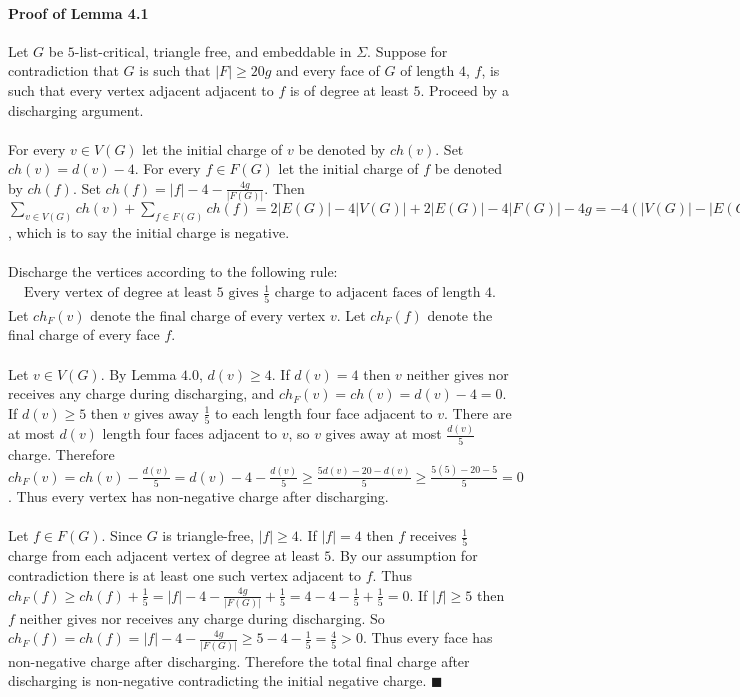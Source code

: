 \documentclass[letterpaper,12pt,oneside,onecolumn]{report}
\begin{document}
\paragraph{Proof of Lemma 4.1}
Let $G$ be $5$-list-critical, triangle free, and embeddable in $\Sigma$. Suppose for contradiction that $G$ is such that $|F| \geq 20g$ and every face of $G$ of length $4$, $f$, is such that every vertex adjacent adjacent to $f$ is of degree at least $5$. Proceed by a discharging argument.
\paragraph{}
For every $v \in V(G)$ let the initial charge of $v$ be denoted by $ch(v)$. Set $ch(v) = d(v) - 4$. For every $f \in F(G)$ let the initial charge of $f$ be denoted by $ch(f)$. Set $ch(f) = |f| - 4 -\frac{4g}{|F(G)|}$. Then $\sum_{v \in V(G)} ch(v) + \sum_{f \in F(G)} ch(f) = 2|E(G)| - 4|V(G)| + 2|E(G)| - 4|F(G)| -4g = -4(|V(G)| - |E(G)| + |F(G)| + g) = -4(2-g + g) = -8$, which is to say the initial charge is negative.
\paragraph{}
Discharge the vertices according to the following rule:
\begin{align}
\text{Every vertex of degree at least $5$ gives $\frac{1}{5}$ charge to adjacent faces of length $4$.}
\end{align}
Let $ch_F(v)$ denote the final charge of every vertex $v$. Let $ch_F(f)$ denote the final charge of every face $f$.
\paragraph{}
Let $v \in V(G)$. By Lemma $4.0$, $d(v) \geq 4$. If $d(v) = 4$ then $v$ neither gives nor receives any charge during discharging, and $ch_F(v) = ch(v) = d(v) - 4 = 0$. If $d(v) \geq 5$ then $v$ gives away $\frac{1}{5}$ to each length four face adjacent to $v$. There are at most $d(v)$ length four faces adjacent to $v$, so $v$ gives away at most $\frac{d(v)}{5}$ charge. Therefore $ch_F(v) = ch(v) - \frac{d(v)}{5} = d(v) - 4 - \frac{d(v)}{5} \geq \frac{5d(v) - 20 - d(v)}{5} \geq \frac{5(5) - 20 -5}{5} = 0$. Thus every vertex has non-negative charge after discharging.
\paragraph{}
Let $f \in F(G)$. Since $G$ is triangle-free, $|f| \geq 4$. If $|f| = 4$ then $f$ receives $\frac{1}{5}$ charge from each adjacent vertex of degree at least $5$. By our assumption for contradiction there is at least one such vertex adjacent to $f$. Thus $ch_F(f) \geq ch(f) + \frac{1}{5} = |f| - 4 - \frac{4g}{|F(G)|} + \frac{1}{5} = 4 - 4 - \frac{1}{5} + \frac{1}{5} = 0$. If $|f| \geq 5$ then $f$ neither gives nor receives any charge during discharging. So $ch_F(f) = ch(f) = |f| - 4 -\frac{4g}{|F(G)|} \geq 5 - 4 - \frac{1}{5} = \frac{4}{5} > 0$. Thus every face has non-negative charge after discharging. Therefore the total final charge after discharging is non-negative contradicting the initial negative charge. $\blacksquare$
\end{document}

